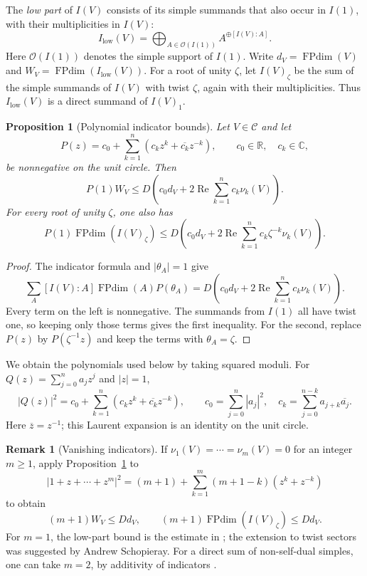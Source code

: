 \documentclass[11pt]{amsart}
\newtheorem{proposition}[theorem]{Proposition}
\theoremstyle{definition}
\newtheorem{remark}[theorem]{Remark}
\DeclareMathOperator{\FPdim}{FPdim}
\newcommand{\C}{\mathbb C}
\numberwithin{equation}{section}
\begin{document}
The \emph{low part} of $I(V)$ consists of its simple summands that also
occur in $I(1)$, with their multiplicities in $I(V)$:
\[
 I_{\mathrm{low}}(V)
 =\bigoplus_{A\in\mathcal O(I(1))}A^{\oplus[I(V):A]}.
\]
Here $\mathcal O(I(1))$ denotes the simple support of $I(1)$.
Write $d_V=\FPdim(V)$ and $W_V=\FPdim(I_{\mathrm{low}}(V))$.
For a root of unity $\zeta$, let $I(V)_\zeta$ be the sum of the simple
summands of $I(V)$ with twist $\zeta$, again with their multiplicities.
Thus $I_{\mathrm{low}}(V)$ is a direct summand of $I(V)_1$.

\begin{proposition}[Polynomial indicator bounds]\label{lem:indicator-polynomials}
Let $V\in\mathcal C$ and let
\[
 P(z)=c_0+\sum_{k=1}^n(c_kz^k+\overline{c_k}z^{-k}),
 \qquad c_0\in\mathbb R,\quad c_k\in\C,
\]
be nonnegative on the unit circle. Then
\[
 P(1)W_V\leq D\left(c_0d_V+
                    2\operatorname{Re}\sum_{k=1}^n c_k\nu_k(V)\right).
\]
For every root of unity $\zeta$, one also has
\[
 P(1)\FPdim(I(V)_\zeta)
 \leq D\left(c_0d_V+
       2\operatorname{Re}\sum_{k=1}^n c_k\zeta^{-k}\nu_k(V)\right).
\]
\end{proposition}
\begin{proof}
The indicator formula and $|\theta_A|=1$ give
\[
 \sum_A[I(V):A]\FPdim(A)P(\theta_A)
 =D\left(c_0d_V+2\operatorname{Re}\sum_{k=1}^n c_k\nu_k(V)\right).
\]
Every term on the left is nonnegative. The summands from $I(1)$ all
have twist one, so keeping only those terms gives the first inequality.
For the second, replace $P(z)$ by $P(\zeta^{-1}z)$ and keep the terms
with $\theta_A=\zeta$.
\end{proof}

We obtain the polynomials used below by taking squared moduli.
For $Q(z)=\sum_{j=0}^n a_jz^j$ and $|z|=1$,
\[
 |Q(z)|^2=c_0+\sum_{k=1}^n(c_kz^k+\overline{c_k}z^{-k}),\qquad
 c_0=\sum_{j=0}^n|a_j|^2,\quad
 c_k=\sum_{j=0}^{n-k}a_{j+k}\overline{a_j}.
\]
Here $\overline z=z^{-1}$; this Laurent expansion is an identity on
the unit circle.

\begin{remark}[Vanishing indicators]\label{rem:vanishing-indicators}
If $\nu_1(V)=\cdots=\nu_m(V)=0$ for an integer $m\geq1$, apply
Proposition~\ref{lem:indicator-polynomials} to
\[
 |1+z+\cdots+z^m|^2
 =(m+1)+\sum_{k=1}^m(m+1-k)(z^k+z^{-k})
\]
to obtain
\[
 (m+1)W_V\leq Dd_V,\qquad
 (m+1)\FPdim(I(V)_\zeta)\leq Dd_V.
\]
For $m=1$, the low-part bound is the estimate in
\cite[proof of Theorem~2.21]{OstrikRank3}; the extension to twist
sectors was suggested by Andrew Schopieray. For a direct sum of
non-self-dual simples, one can take $m=2$, by additivity of indicators
\cite[Corollary~7.8]{NgSchauenburgHigher}.
\end{remark}
\end{document}
